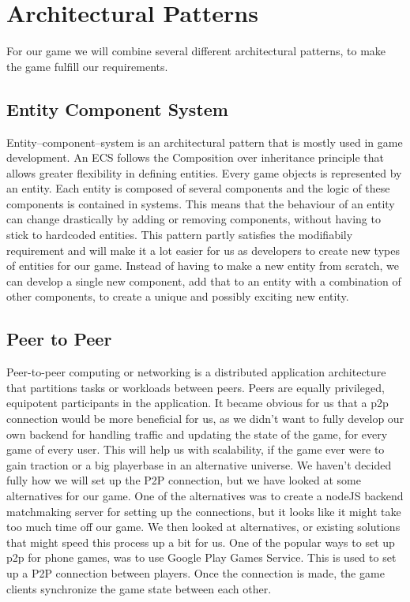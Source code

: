 \section{Architectural Patterns}
For our game we will combine several different architectural patterns, to make the game fulfill our requirements.

\subsection{Entity Component System}
Entity–component–system \cite{wiki:ecs} is an architectural pattern that is mostly used in game development. An ECS follows the Composition over inheritance principle that allows greater flexibility in defining entities.
Every game objects is represented by an entity. Each entity is composed of several components and the logic of these components is contained in systems. This means that the behaviour of an entity can change drastically by adding or removing components, without having to stick to hardcoded entities.
This pattern partly satisfies the modifiabily requirement and will make it a lot easier for us as developers to create new types of entities for our game. Instead of having to make a new entity from scratch, we can develop a single new component, add that to an entity with a combination of other components, to create a unique and possibly exciting new entity.

\subsection{Peer to Peer}
Peer-to-peer \cite{wiki:p2p} computing or networking is a distributed application architecture that partitions tasks or workloads between peers. Peers are equally privileged, equipotent participants in the application.
It became obvious for us that a p2p connection would be more beneficial for us, as we didn't want to fully develop our own backend for handling traffic and updating the state of the game, for every game of every user. This will help us with scalability, if the game ever were to gain traction or a big playerbase in an alternative universe.
We haven't decided fully how we will set up the P2P connection, but we have looked at some alternatives for our game.
One of the alternatives was to create a nodeJS backend matchmaking server for setting up the connections, but it looks like it might take too much time off our game. We then looked at alternatives, or existing solutions that might speed this process up a bit for us.
One of the popular ways to set up p2p for phone games, was to use Google Play Games Service. This is used to set up a P2P connection between players. Once the connection is made, the game clients synchronize the game state between each other.

